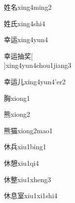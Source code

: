 \begin{verbete}[8;6]{姓名}{xing4ming2}
\end{verbete}

\begin{verbete}[8;4]{姓氏}{xing4shi4}
\end{verbete}

\begin{verbete}[8;7]{幸运}{xing4yun4}
\end{verbete}

\begin{verbete}[8;7;8;9]{幸运抽奖}[\\]{xing4yun4chou1jiang3}
\end{verbete}

\begin{verbete}[8;7;2]{幸运儿}{xing4yun4'er2}
\end{verbete}

\begin{verbete}[10]{胸}{xiong1}
\end{verbete}

\begin{verbete}[14]{熊}{xiong2}
\end{verbete}

\begin{verbete}[14;11]{熊猫}{xiong2mao1}
\end{verbete}

\begin{verbete}[6;7]{休兵}{xiu1bing1}
\end{verbete}

\begin{verbete}[6;16]{休憩}{xiu1qi4}
\end{verbete}

\begin{verbete}[6;16]{休整}{xiu1xheng3}
\end{verbete}

\begin{verbete}[6;10;9]{休息室}{xiu1xi1shi4}
\end{verbete}

